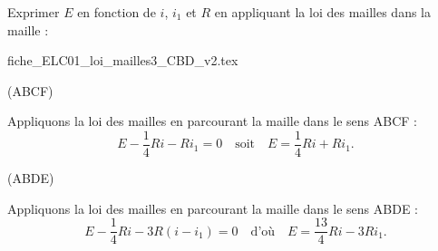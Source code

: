 \medskip

Exprimer $E$ en fonction de $i$, $i_1$ et $R$ en appliquant la loi des mailles dans la maille :
                                \initialisationPartieDroite %
\begin{center}
{fiche_ELC01_loi_mailles3_CBD_v2.tex}
\end{center}
                               \finalisationDuPartageDePage %

\medskip
\debutEntrainement



\begin{enonce}
(ABCF)
\end{enonce}


\begin{corrige} 
	Appliquons la loi des mailles en parcourant la maille dans le sens ABCF : 
	\[
	E-\frac14 Ri-Ri_1=0
	\quad\text{soit}\quad
	E=\frac14 Ri+Ri_1.
	\]
\end{corrige}




\begin{enonce}
(ABDE)
\end{enonce}


\begin{corrigeNewpage}
	Appliquons la loi des mailles en parcourant la maille dans le sens ABDE : 
	\[
	E-\frac14 Ri-3R(i-i_1)=0
	\quad\text{d'où}\quad
	E=\frac{13}{4}Ri-3Ri_1.
	\]
\end{corrigeNewpage}


